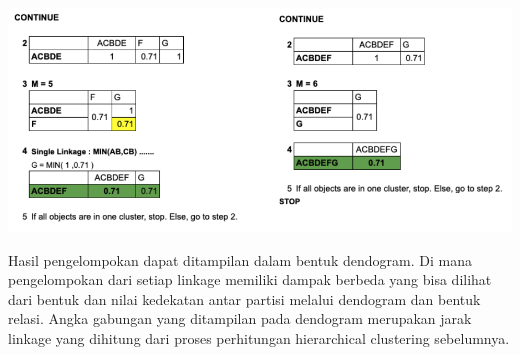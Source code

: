 \begin{center}
	\includegraphics[width=14cm]{img/bab_3/hc_detail_4.png}
	\label{fig:hc_detail_4}
\end{center}

Hasil pengelompokan dapat ditampilan dalam bentuk dendogram.  Di mana pengelompokan dari setiap linkage memiliki dampak berbeda yang bisa dilihat dari bentuk dan nilai kedekatan antar partisi melalui dendogram dan bentuk relasi. Angka gabungan yang ditampilan pada dendogram merupakan jarak linkage yang dihitung dari proses perhitungan hierarchical clustering sebelumnya.

